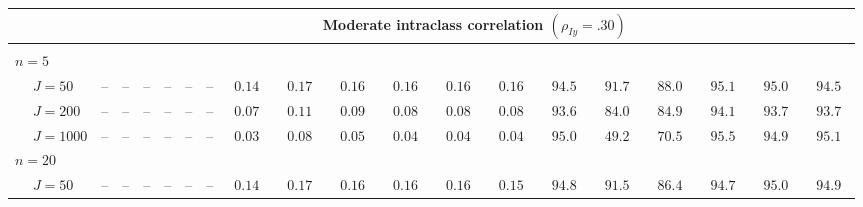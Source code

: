\begin{sidewaystable}
\begin{threeparttable}
\begin{tabular}{llcccccccccccccccccc}
& & \multicolumn{18}{c}{Moderate intraclass correlation $(\rho_{Iy}=.30)$} \\[0.6ex]\hline\\[-1.8ex]
\multicolumn{4}{l}{$n=5$} \\  & \nopagebreak $\;J=50$  & \phantom{00}--\phantom{00} & \phantom{00}--\phantom{00} & \phantom{00}--\phantom{00} & \phantom{00}--\phantom{00} & \phantom{00}--\phantom{00} & \phantom{00}--\phantom{00} & $\phantom{0}0.14\phantom{0}$ & $\phantom{0}0.17\phantom{0}$ & $\phantom{0}0.16\phantom{0}$ & $\phantom{0}0.16\phantom{0}$ & $\phantom{0}0.16\phantom{0}$ & $\phantom{0}0.16\phantom{0}$ & $\phantom{0}94.5\phantom{0}$ & $\phantom{0}91.7\phantom{0}$ & $\phantom{0}88.0\phantom{0}$ & $\phantom{0}95.1\phantom{0}$ & $\phantom{0}95.0\phantom{0}$ & $\phantom{0}94.5\phantom{0}$ \\
 & \nopagebreak $\;J=200$  & \phantom{00}--\phantom{00} & \phantom{00}--\phantom{00} & \phantom{00}--\phantom{00} & \phantom{00}--\phantom{00} & \phantom{00}--\phantom{00} & \phantom{00}--\phantom{00} & $\phantom{0}0.07\phantom{0}$ & $\phantom{0}0.11\phantom{0}$ & $\phantom{0}0.09\phantom{0}$ & $\phantom{0}0.08\phantom{0}$ & $\phantom{0}0.08\phantom{0}$ & $\phantom{0}0.08\phantom{0}$ & $\phantom{0}93.6\phantom{0}$ & $\phantom{0}84.0\phantom{0}$ & $\phantom{0}84.9\phantom{0}$ & $\phantom{0}94.1\phantom{0}$ & $\phantom{0}93.7\phantom{0}$ & $\phantom{0}93.7\phantom{0}$ \\
 & \nopagebreak $\;J=1000$  & \phantom{00}--\phantom{00} & \phantom{00}--\phantom{00} & \phantom{00}--\phantom{00} & \phantom{00}--\phantom{00} & \phantom{00}--\phantom{00} & \phantom{00}--\phantom{00} & $\phantom{0}0.03\phantom{0}$ & $\phantom{0}0.08\phantom{0}$ & $\phantom{0}0.05\phantom{0}$ & $\phantom{0}0.04\phantom{0}$ & $\phantom{0}0.04\phantom{0}$ & $\phantom{0}0.04\phantom{0}$ & $\phantom{0}95.0\phantom{0}$ & $\phantom{0}49.2\phantom{0}$ & $\phantom{0}70.5\phantom{0}$ & $\phantom{0}95.5\phantom{0}$ & $\phantom{0}94.9\phantom{0}$ & $\phantom{0}95.1\phantom{0}$ \\
\multicolumn{4}{l}{$n=20$} \\  & \nopagebreak $\;J=50$  & \phantom{00}--\phantom{00} & \phantom{00}--\phantom{00} & \phantom{00}--\phantom{00} & \phantom{00}--\phantom{00} & \phantom{00}--\phantom{00} & \phantom{00}--\phantom{00} & $\phantom{0}0.14\phantom{0}$ & $\phantom{0}0.17\phantom{0}$ & $\phantom{0}0.16\phantom{0}$ & $\phantom{0}0.16\phantom{0}$ & $\phantom{0}0.16\phantom{0}$ & $\phantom{0}0.15\phantom{0}$ & $\phantom{0}94.8\phantom{0}$ & $\phantom{0}91.5\phantom{0}$ & $\phantom{0}86.4\phantom{0}$ & $\phantom{0}94.7\phantom{0}$ & $\phantom{0}95.0\phantom{0}$ & $\phantom{0}94.9\phantom{0}$ \\

\end{tabular}
\end{threeparttable}
\end{sidewaystable}
